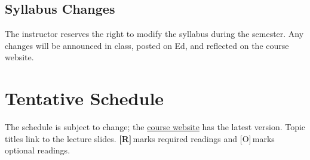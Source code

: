 \documentclass[11pt]{article}
\newcommand{\website}{https://utadvnetworks.github.io/fa26/}
\newcommand{\R}{\textbf{[R]}\,}
\newcommand{\Opt}{\textcolor{ink!70}{[O]}\,}
\begin{document}
\subsection{Syllabus Changes}
The instructor reserves the right to modify the syllabus during the semester.
Any changes will be announced in class, posted on Ed, and reflected on the
course website.

\clearpage
\section{Tentative Schedule}

The schedule is subject to change; the
\href{\website schedule/}{course website} has the latest version. Topic titles link to
the lecture slides. \R marks required readings and \Opt marks optional readings.

\newcommand{\spart}[1]{\rowcolor{partbg}\multicolumn{4}{@{\hspace{4pt}}l}{\rule{0pt}{11pt}\bfseries\color{burnt}#1}\\*}
\newcommand{\noclass}[3]{\rowcolor{nobg}#1 & \multicolumn{2}{l}{\emph{#2}} & #3 \\}
\newcommand{\rowsep}{\arrayrulecolor{black!18}\hline\arrayrulecolor{black}}
\end{document}
